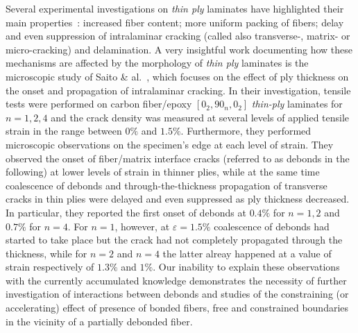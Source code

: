 \documentclass[review]{elsarticle}
\begin{document}
Several experimental investigations on \emph{thin ply} laminates have highlighted their main properties~\cite{Sasayama2003,Tsai2005,Yamaguchi2005,Sihn2007,Yokozeki2008,Yokozeki2010,Moon2011,Arteiro2013,Arteiro2014,Amacher2014,Guillamet2014,Huang2018,Cugnoni2018}: increased fiber content; more uniform packing of fibers; delay and even suppression of intralaminar cracking (called also transverse-, matrix- or micro-cracking) and delamination. A very insightful work documenting how these mechanisms are affected by the morphology of \emph{thin ply} laminates is the microscopic study of Saito \& al.~\cite{Saito2012}, which focuses on the effect of ply thickness on the onset and propagation of intralaminar cracking. In their investigation, tensile tests were performed on carbon fiber/epoxy $\left[0_{2},90_{n},0_{2}\right]$ \emph{thin-ply} laminates for $n=1,2,4$ and the crack density was measured at several levels of applied tensile strain in the range between $0\%$ and $1.5\%$. Furthermore, they performed microscopic observations on the specimen's edge at each level of strain. They observed the onset of fiber/matrix interface cracks (referred to as debonds in the following) at lower levels of strain in thinner plies, while at the same time coalescence of debonds and through-the-thickness propagation of transverse cracks in thin plies were delayed and even suppressed as ply thickness decreased. In particular, they reported the first onset of debonds at $0.4\%$ for $n=1,2$ and $0.7\%$ for $n=4$. For $n=1$, however, at $\varepsilon=1.5\%$ coalescence of debonds had started to take place but the crack had not completely propagated through the thickness, while for $n=2$ and $n=4$ the latter alreay happened at a value of strain respectively of $1.3\%$ and $1\%$. Our inability to explain these observations with the currently accumulated knowledge demonstrates the necessity of further investigation of interactions between debonds and studies of the constraining (or accelerating) effect of presence of bonded fibers, free and constrained boundaries in the vicinity of a partially debonded fiber.\\
\end{document}
